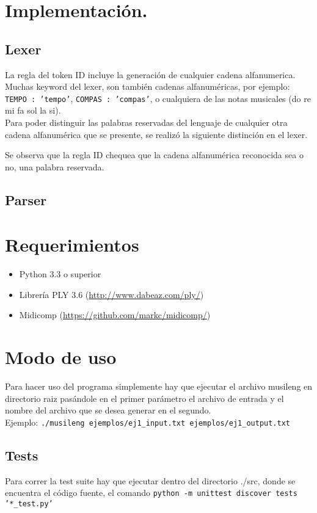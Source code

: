 \documentclass[a4paper,8pt]{article}
\begin{document}
\section{Implementación.}
\subsection{Lexer}
La regla del token ID incluye la generación de cualquier cadena alfanumerica. Muchas keyword del lexer, son también cadenas alfanuméricas, por ejemplo: \texttt{TEMPO : 'tempo'}, \texttt{COMPAS : 'compas'}, o cualquiera de las notas musicales (do re mi fa sol la si). \\Para poder distinguir las palabras reservadas del lenguaje de cualquier otra cadena alfanumérica que se presente, se realizó la siguiente distinción en el lexer. 
\begin{small}
  
\end{small}
Se observa que la regla ID chequea que la cadena alfanumérica reconocida sea o no, una palabra reservada. 

\subsection{Parser}

\section{Requerimientos}
	\begin{itemize}
  		\item Python 3.3 o superior
  		\item Librería PLY 3.6 (\url{http://www.dabeaz.com/ply/})
  		\item Midicomp (\url{https://github.com/markc/midicomp/})
	\end{itemize}

\section{Modo de uso}
Para hacer uso del programa simplemente hay que ejecutar el archivo musileng en directorio raiz pasándole en el primer parámetro el archivo de entrada y el nombre del archivo que se desea generar en el segundo. \\
Ejemplo: \texttt{./musileng ejemplos/ej1\_input.txt ejemplos/ej1\_output.txt }
\subsection{Tests}
Para correr la test suite hay que ejecutar dentro del directorio ./src, donde se encuentra el código fuente, el comando  \texttt{python -m unittest discover tests '*\_test.py'}
\end{document}
